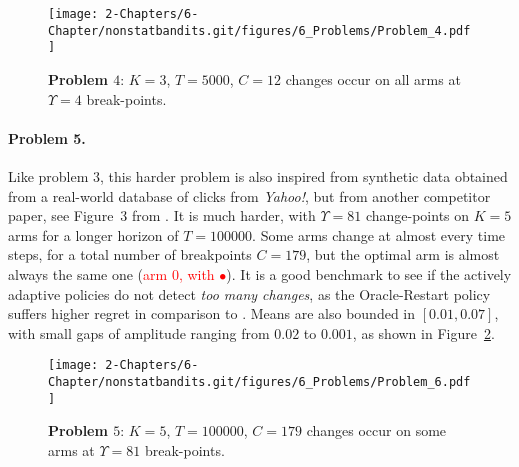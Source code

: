 \begin{figure}[h!]  %
    \centering
    \texttt{[image: 2-Chapters/6-Chapter/nonstatbandits.git/figures/6\_Problems/Problem\_4.pdf]}
    \caption{\textbf{Problem $4$}: $K=3$, $T=5000$, $C=12$ changes occur on all arms at $\Upsilon=4$ break-points.}
    \label{fig:6:Problem_4}
\end{figure}


\paragraph{Problem 5.}

Like problem $3$, this harder problem is also inspired from synthetic data obtained from a real-world database of clicks from \emph{Yahoo!}, but from another competitor paper, see Figure~3 from \cite{LiuLeeShroff17}.
%
It is much harder, with $\Upsilon=81$ change-points on $K=5$ arms for a longer horizon of $T=100000$.
Some arms change at almost every time steps, for a total number of breakpoints $C=179$, but the optimal arm is almost always the same one (\textcolor{red}{arm $0$, with $\bullet$}).
It is a good benchmark to see if the actively adaptive policies do not detect \emph{too many changes}, as the Oracle-Restart policy suffers higher regret in comparison to \klUCB.
Means are also bounded in $[0.01, 0.07]$, with small gaps of amplitude ranging from $0.02$ to $0.001$,
as shown in Figure~\ref{fig:6:Problem_6}.

\begin{figure}[h!]  %
    \centering
    \texttt{[image: 2-Chapters/6-Chapter/nonstatbandits.git/figures/6\_Problems/Problem\_6.pdf]}
    \caption{\textbf{Problem $5$}: $K=5$, $T=100000$, $C=179$ changes occur on some arms at $\Upsilon=81$ break-points.}
    \label{fig:6:Problem_6}
\end{figure}




